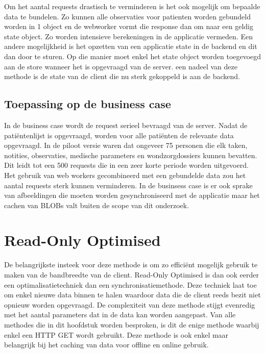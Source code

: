 Om het aantal requests drastisch te verminderen is het ook mogelijk om bepaalde data te bundelen. Zo kunnen alle observaties voor patienten worden gebundeld worden in 1 object en de webworker vormt die response dan om naar een geldig state object. Zo worden intensieve berekeningen in de applicatie vermeden. Een andere mogelijkheid is het opzetten van een applicatie state in de backend en dit dan door te sturen. Op die manier moet enkel het state object worden toegevoegd aan de store wanneer het is opgevraagd van de server. een nadeel van deze methode is de state van de client die nu sterk gekoppeld is aan de backend.

\subsection{Toepassing op de business case}
In de business case wordt de request serieel bevraagd van de server. Nadat de pati\"entenlijst is opgevraagd, worden voor alle pati\"enten de relevante data opgevraagd. In de piloot versie waren dat ongeveer 75 personen die elk taken, notities, observaties, medische parameters en wondzorgdossiers kunnen bevatten. Dit leidt tot een 500 requests die in een zeer korte periode worden uitgevoerd. Het gebruik van web workers gecombineerd met een gebundelde data zou het aantal requests sterk kunnen verminderen. In de businsess case is er ook sprake van afbeeldingen die moeten worden gesynchroniseerd met de applicatie maar het cachen van BLOBs valt buiten de scope van dit onderzoek.

\section{Read-Only Optimised}
De belangrijkste insteek voor deze methode is om zo effici\"ent mogelijk gebruik te maken van de bandbreedte van de client. Read-Only Optimised is dan ook eerder een optimalisatietechniek dan een synchronisatiemethode. Deze techniek laat toe om enkel nieuwe data binnen te halen waardoor data die de client reeds bezit niet opnieuw worden opgevraagd. De complexiteit van deze methode stijgt evenredig met het aantal parameters dat in de data kan worden aangepast. Van alle methodes die in dit hoofdstuk worden besproken, is dit de enige methode waarbij enkel een HTTP GET wordt gebruikt. Deze methode is ook enkel maar belangrijk bij het caching van data voor offline en online gebruik.
